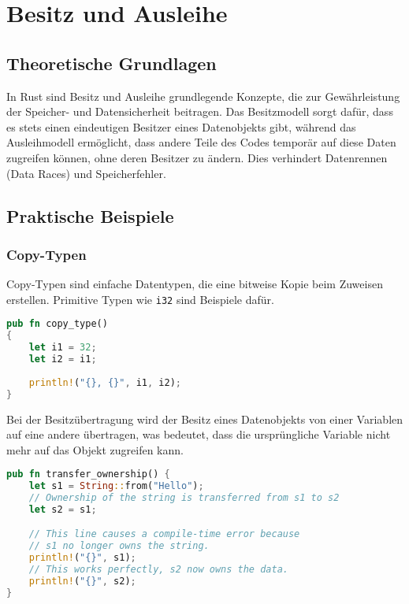 \chapter{Besitz und Ausleihe}

\section{Theoretische Grundlagen}

In Rust sind Besitz und Ausleihe grundlegende Konzepte, die zur Gewährleistung der Speicher- und Datensicherheit beitragen. 
Das Besitzmodell sorgt dafür, dass es stets einen eindeutigen Besitzer eines Datenobjekts gibt, während das Ausleihmodell ermöglicht, dass andere Teile des Codes temporär auf diese Daten zugreifen können, ohne deren Besitzer zu ändern. 
Dies verhindert Datenrennen (Data Races) und Speicherfehler.

\section{Praktische Beispiele}

\subsection{Copy-Typen}
Copy-Typen sind einfache Datentypen, die eine bitweise Kopie beim Zuweisen erstellen. Primitive Typen wie \texttt{i32} sind Beispiele dafür.

\begin{lstlisting}[language=Rust, caption=Copy-Typen]
pub fn copy_type() 
{
    let i1 = 32;
    let i2 = i1;
    
    println!("{}, {}", i1, i2);
}
\end{lstlisting}
\noindent
Bei der Besitzübertragung wird der Besitz eines Datenobjekts von einer Variablen auf eine andere übertragen, was bedeutet, dass die ursprüngliche Variable nicht mehr auf das Objekt zugreifen kann.

\begin{lstlisting}[language=Rust, caption=Unveränderliche Ausleihe]
pub fn transfer_ownership() {
    let s1 = String::from("Hello");
    // Ownership of the string is transferred from s1 to s2
    let s2 = s1;  

    // This line causes a compile-time error because 
    // s1 no longer owns the string.
    println!("{}", s1); 
    // This works perfectly, s2 now owns the data.
    println!("{}", s2); 
}
\end{lstlisting}
\cleardoublepage
